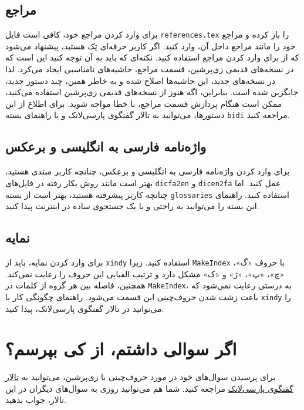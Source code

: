 \subsection{مراجع}
برای وارد کردن مراجع \پ خود، کافی است فایل 
\verb!references.tex!
را باز کرده و مراجع خود را مانند مراجع داخل آن، وارد کنید. اگر کاربر حرفه‌ای تِک هستید، پیشنهاد می‌شود که از  برای 
وارد کردن مراجع استفاده کنید. نکته‌ای که باید به آن توجه کنید این است که در نسخه‌های قدیمی زی‌پرشین، 
قسمت مراجع، حاشیه‌های نامناسبی ایجاد می‌کرد. لذا در نسخه‌های جدید، این حاشیه‌ها اصلاح شده و به خاطر همین، چند دستور جدید، جایگزین شده است. بنابراین، اگه هنوز از نسخه‌های قدیمی زی‌پرشین استفاده می‌کنید، ممکن است هنگام پردازش قسمت مراجع، با خطا مواجه شوید. برای اطلاع از این دستورها، می‌توانید به تالار گفتگوی پارسی‌لاتک و یا راهنمای بسته 
\verb!bidi!
مراجعه کنید.
\subsection{واژه‌نامه فارسی به انگلیسی و برعکس}
برای وارد کردن واژه‌نامه فارسی به انگلیسی و برعکس، چنانچه کاربر مبتدی هستید، بهتر است مانند روش بکار رفته در فایل‌های 
\verb!dicfa2en!
و
\verb!dicen2fa!
عمل کنید. اما چنانچه کاربر پیشرفته هستید، بهتر است از بسته
\verb!glossaries!
استفاده کنید. راهنمای این بسته را می‌توانید به راحتی و با یک جستجوی ساده در اینترنت پیدا کنید.
\subsection{نمایه}
برای وارد کردن نمایه، باید از 
\verb!xindy!
استفاده کنید. زیرا 
\verb!MakeIndex!
با حروف «گ»، «چ»، «پ»، «ژ» و «ک» مشکل دارد و ترتیب الفبایی این حروف را رعایت نمی‌کند. همچنین، فاصله بین هر گروه از کلمات در 
\verb!MakeIndex!،
به درستی رعایت نمی‌شود که باعث زشت شدن حروف‌چینی این قسمت می‌شود. راهنمای چگونگی کار با 
\verb!xindy! 
را می‌توانید در تالار گفتگوی پارسی‌لاتک، پیدا کنید.
\section{اگر سوالی داشتم، از کی بپرسم؟}
برای پرسیدن سوال‌های خود در مورد حروف‌چینی با زی‌پرشین،  می‌توانید به
 \href{http://forum.parsilatex.com}{تالار گفتگوی پارسی‌لاتک}%
مراجعه کنید. شما هم می‌توانید روزی به سوال‌های دیگران در این تالار، جواب بدهید.
    
